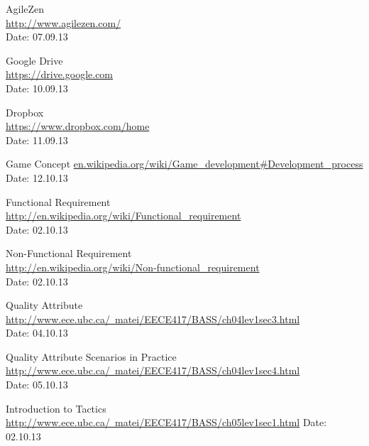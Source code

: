 \begin{thebibliography}{99}
	AgileZen \\
	\href{http://www.agilezen.com/}{http://www.agilezen.com/} \\
	Date: 07.09.13

	Google Drive \\
	\href{https://drive.google.com}{https://drive.google.com} \\
	Date: 10.09.13

	Dropbox \\
	\href{https://www.dropbox.com/home}{https://www.dropbox.com/home} \\
	Date: 11.09.13

	Game Concept\newline
	\href {en.wikipedia.org/wiki/Game_development#Development_process}{en.wikipedia.org/wiki/Game\_development\#Development\_process}\newline
	Date: 12.10.13

	Functional Requirement \\
	\href{http://en.wikipedia.org/wiki/Functional_requirement}{http://en.wikipedia.org/wiki/Functional\_requirement} \\
	Date: 02.10.13

	Non-Functional Requirement \\
	\href{http://en.wikipedia.org/wiki/Non-functional_requirement}{http://en.wikipedia.org/wiki/Non-functional\_requirement} \\
	Date: 02.10.13

	Quality Attribute \\
	\href{http://www.ece.ubc.ca/~matei/EECE417/BASS/ch04lev1sec3.html}{http://www.ece.ubc.ca/~matei/EECE417/BASS/ch04lev1sec3.html} \\
	Date: 04.10.13

	Quality Attribute Scenarios in Practice \\ 
	\href{http://www.ece.ubc.ca/~matei/EECE417/BASS/ch04lev1sec4.html}{http://www.ece.ubc.ca/~matei/EECE417/BASS/ch04lev1sec4.html} \\
	Date: 05.10.13

	Introduction to Tactics \newline
	\href {http://www.ece.ubc.ca/~matei/EECE417/BASS/ch05lev1sec1.html}{http://www.ece.ubc.ca/~matei/EECE417/BASS/ch05lev1sec1.html} \newline
	Date: 02.10.13


\end{thebibliography}
